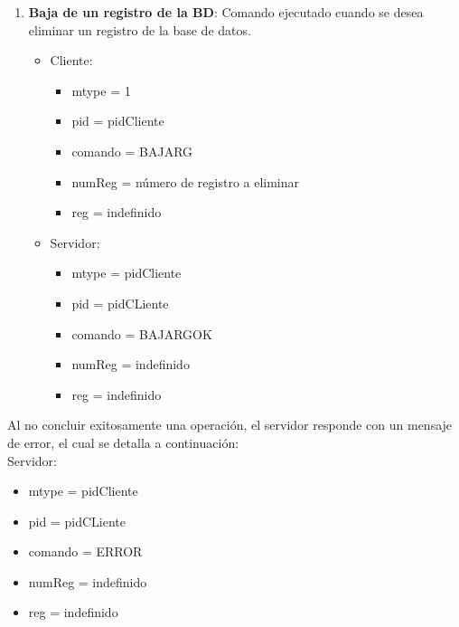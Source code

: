 \documentclass[a4paper,10pt]{article}
\begin{document}
\begin{enumerate}
		\item{\bf Baja de un registro de la BD}: Comando ejecutado cuando se desea eliminar un registro de la base de datos.
			\begin{itemize}
				\item Cliente:
				\begin{itemize}
					\item[]mtype = 1
					\item[]pid = pidCliente
					\item[]comando = BAJARG 
					\item[]numReg = n\'umero de registro a eliminar
					\item[]reg = indefinido
				\end{itemize}
				\item Servidor:
				\begin{itemize}
					\item[]mtype = pidCliente 
					\item[]pid = pidCLiente
					\item[]comando = BAJARGOK
					\item[]numReg = indefinido
					\item[]reg = indefinido
				\end{itemize}
			\end{itemize}
		\end{enumerate}
	Al no concluir exitosamente una operaci\'on, el servidor responde con un mensaje de error, el cual se detalla a continuaci\'on: \\
		Servidor:
			\begin{itemize}
				\item[]mtype = pidCliente 
				\item[]pid = pidCLiente
				\item[]comando = ERROR
				\item[]numReg = indefinido
				\item[]reg = indefinido
			\end{itemize}
\end{document}
